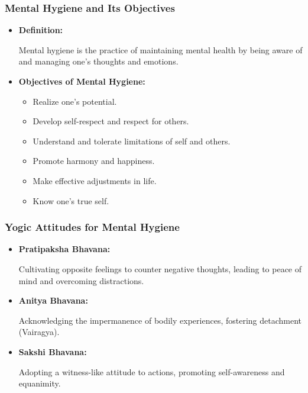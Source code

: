 \begin{frame}[fragile]\frametitle{Mental Hygiene and Its Objectives}

      \begin{itemize}
        \item \textbf{Definition:}
        
        Mental hygiene is the practice of maintaining mental health by being aware of and managing one's thoughts and emotions.
        
        \item \textbf{Objectives of Mental Hygiene:}
        \begin{itemize}
            \item Realize one's potential.
            \item Develop self-respect and respect for others.
            \item Understand and tolerate limitations of self and others.
            \item Promote harmony and happiness.
            \item Make effective adjustments in life.
            \item Know one's true self.
        \end{itemize}
      \end{itemize}

\end{frame}

\begin{frame}[fragile]\frametitle{Yogic Attitudes for Mental Hygiene}

      \begin{itemize}
        \item \textbf{Pratipaksha Bhavana:}
        
        Cultivating opposite feelings to counter negative thoughts, leading to peace of mind and overcoming distractions.
        
        \item \textbf{Anitya Bhavana:}
        
        Acknowledging the impermanence of bodily experiences, fostering detachment (Vairagya).
        
        \item \textbf{Sakshi Bhavana:}
        
        Adopting a witness-like attitude to actions, promoting self-awareness and equanimity.
        
      \end{itemize}

\end{frame}

